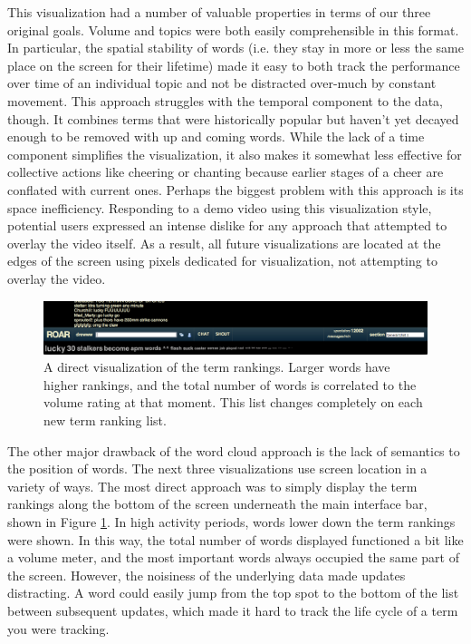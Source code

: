 This visualization had a number of valuable properties in terms of our three original goals. Volume and topics were both easily comprehensible in this format. In particular, the spatial stability of words (i.e. they stay in more or less the same place on the screen for their lifetime) made it easy to both track the performance over time of an individual topic and not be distracted over-much by constant movement. This approach struggles with the temporal component to the data, though. It combines terms that were historically popular but haven't yet decayed enough to be removed with up and coming words. While the lack of a time component simplifies the visualization, it also makes it somewhat less effective for collective actions like cheering or chanting because earlier stages of a cheer are conflated with current ones. Perhaps the biggest problem with this approach is its space inefficiency. Responding to a demo video using this visualization style, potential users expressed an intense dislike for any approach that attempted to overlay the video itself. As a result, all future visualizations are located at the edges of the screen using pixels dedicated for visualization, not attempting to overlay the video.

\begin{figure}[tb]
	\includegraphics{figures/roar/bar.png}
	\caption{A direct visualization of the term rankings. Larger words have higher rankings, and the total number of words is correlated to the volume rating at that moment. This list changes completely on each new term ranking list.}
	\label{fig:pulse_rankings}
\end{figure}

The other major drawback of the word cloud approach is the lack of semantics to the position of words. The next three visualizations use screen location in a variety of ways. The most direct approach was to simply display the term rankings along the bottom of the screen underneath the main interface bar, shown in Figure \ref{fig:pulse_rankings}. In high activity periods, words lower down the term rankings were shown. In this way, the total number of words displayed functioned a bit like a volume meter, and the most important words always occupied the same part of the screen. However, the noisiness of the underlying data made updates distracting. A word could easily jump from the top spot to the bottom of the list between subsequent updates, which made it hard to track the life cycle of a term you were tracking. 

